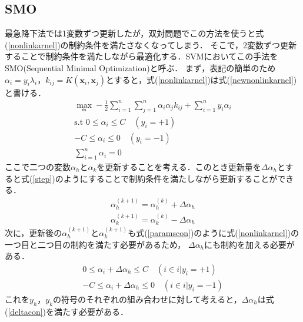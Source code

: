 \documentclass[11pt,a4paper,titlepage]{ltjsarticle}
\begin{document}
\subsection{SMO}
\label{smo}
最急降下法では1変数ずつ更新したが，双対問題でこの方法を使うと式(\ref{nonlinkarnel})の制約条件を満たさなくなってしまう．
そこで，2変数ずつ更新することで制約条件を満たしながら最適化する．SVMにおいてこの手法をSMO(Sequential Minimal Optimization)と呼ぶ\cite{optimize}．
まず，表記の簡単のため$\alpha_i = y_i\lambda_i$，$k_{ij} = K(\bm{x}_i,\bm{x}_j)$とすると，式(\ref{nonlinkarnel})は式(\ref{newnonlinkarnel})と書ける．
\begin{equation}
    \label{newnonlinkarnel}
    \begin{gathered}
        \max_{\bm{\alpha}} -\frac{1}{2}\sum_{i=1}^{n}\sum_{j=1}^{n}\alpha_i\alpha_jk_{ij} + \sum_{i=1}^{n}y_i\alpha_i\\
        \text{s.t }0\leq\alpha_i\leq C \quad ( y_i = +1)\\
        -C \leq \alpha_i \leq 0 \quad ( y_i = -1)\\
        \sum_{i=1}^{n}\alpha_i = 0
    \end{gathered}
\end{equation}
ここで二つの変数$\alpha_h$と$\alpha_k$を更新することを考える．このとき更新量を$\Delta\alpha_h$とすると式(\ref{step})のようにすることで制約条件を満たしながら更新することができる．
\begin{equation}
    \label{step}
    \begin{gathered}
        \alpha_h^{(k+1)} = \alpha_h^{(k)} + \Delta\alpha_h\\
        \alpha_k^{(k+1)} = \alpha_k^{(k)} - \Delta\alpha_h
    \end{gathered}
\end{equation}
次に，更新後の$\alpha_h^{(k+1)}$と$\alpha_k^{(k+1)}$も式(\ref{paramscon})のように式(\ref{nonlinkarnel})の一つ目と二つ目の制約を満たす必要があるため，
$\Delta\alpha_h$にも制約を加える必要がある．
\begin{equation}
    \label{paramscon}
    \begin{gathered}
        0\leq\alpha_i + \Delta\alpha_h \leq C\quad(i \in {i | y_i = +1})\\
        -C \leq \alpha_i + \Delta\alpha_h \leq 0 \quad (i \in {i | y_i = -1})
    \end{gathered}
\end{equation}
これを$y_h$，$y_k$の符号のそれぞれの組み合わせに対して考えると，$\Delta\alpha_h$は式(\ref{deltacon})を満たす必要がある．
\end{document}
